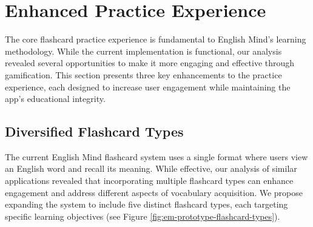 \section{Enhanced Practice Experience}
\label{sec:em-gamification-practice-experience}
The core flashcard practice experience is fundamental to English Mind's learning methodology. While the current implementation is functional, our analysis revealed several opportunities to make it more engaging and effective through gamification. This section presents three key enhancements to the practice experience, each designed to increase user engagement while maintaining the app's educational integrity.

\subsection{Diversified Flashcard Types}

The current English Mind flashcard system uses a single format where users view an English word and recall its meaning. While effective, our analysis of similar applications revealed that incorporating multiple flashcard types can enhance engagement and address different aspects of vocabulary acquisition. We propose expanding the system to include five distinct flashcard types, each targeting specific learning objectives (see Figure \ref{fig:em-prototype-flashcard-types}).

